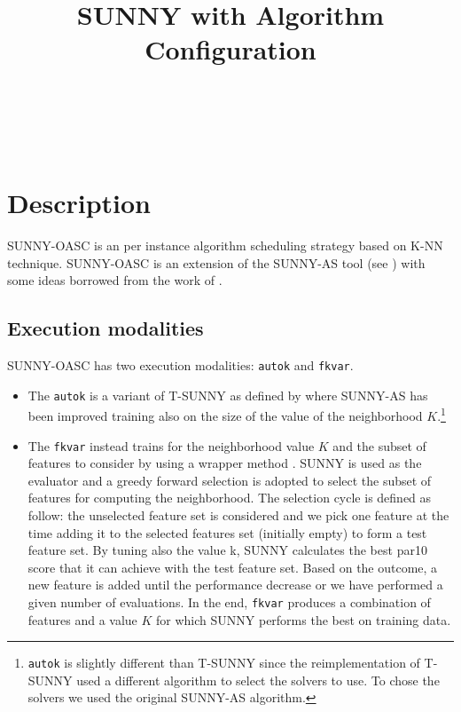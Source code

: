 \documentclass[tablecaption=bottom,wcp]{jmlr} %
\title[SUNNY-OASC]{SUNNY with Algorithm Configuration}
\author{\Name{Tong Liu} \Email{t.liu@unibo.it}\\
   \Name{Roberto Amadini} \Email{roberto.amadini@unimelb.edu.au}\\
   \Name{Jacopo Mauro} \Email{mauro.jacopo@gmail.com}\\
    }
\begin{document}
\maketitle



\section{Description}

SUNNY-OASC is an per instance algorithm scheduling strategy based on K-NN 
technique.
SUNNY-OASC is an extension of 
the SUNNY-AS tool (see \cite{ictai_paper,sunnyas}) with some 
ideas borrowed from the work of  
\cite{DBLP:conf/lion/LindauerBH16}. 


\subsection{Execution modalities}

SUNNY-OASC has two execution modalities: \texttt{autok} and 
\texttt{fkvar}. 

\begin{itemize}
  \item The \texttt{autok} is a variant of T-SUNNY as defined by 
\cite{DBLP:conf/lion/LindauerBH16} where SUNNY-AS has been improved training 
also on the size of the value of the neighborhood 
$K$.\footnote{\texttt{autok} is slightly different than T-SUNNY since the 
reimplementation of T-SUNNY used a different algorithm to select the 
solvers to use. To chose the solvers we used the original SUNNY-AS 
algorithm.}
  \item The \texttt{fkvar} instead trains for the neighborhood value $K$ and 
the subset of features to consider by using a wrapper method 
\cite{Kohavi97wrappersfor}. SUNNY is used as the evaluator and a 
greedy forward selection is adopted to select the subset of features for 
computing the neighborhood.
% 
The selection cycle is defined as follow: 
the unselected feature set is considered and we pick one feature at the time 
adding it to the selected features set (initially empty) to form a test 
feature set. By tuning also the value k, SUNNY calculates the best par10 score 
that it can achieve with the test feature set. Based on the outcome, a new 
feature is added until the performance decrease or we have performed a given 
number of evaluations. In the end, \texttt{fkvar} 
produces a combination of features and a value $K$ for which SUNNY performs the 
best on training data.
\end{itemize}
 
\end{document}
